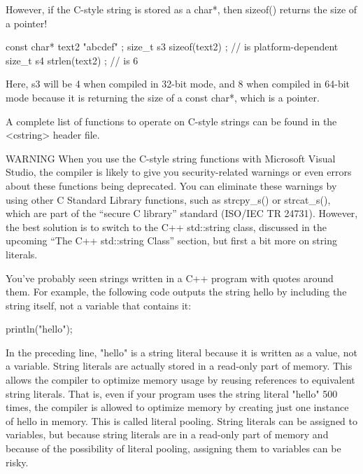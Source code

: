 However, if the C-style string is stored as a char*, then sizeof() returns the size of a pointer!

\begin{cpp}
const char* text2 { "abcdef" };
size_t s3 { sizeof(text2) }; // is platform-dependent
size_t s4 { strlen(text2) }; // is 6
\end{cpp}

Here, s3 will be 4 when compiled in 32-bit mode, and 8 when compiled in 64-bit mode because it is returning the size of a const char*, which is a pointer.

A complete list of functions to operate on C-style strings can be found in the <cstring> header file.

\begin{myWarning}{WARNING}
When you use the C-style string functions with Microsoft Visual Studio, the compiler is likely to give you security-related warnings or even errors about these functions being deprecated. You can eliminate these warnings by using other C Standard Library functions, such as strcpy\_s() or strcat\_s(), which are part of the “secure C library” standard (ISO/IEC TR 24731). However, the best solution is to switch to the C++ std::string class, discussed in the upcoming “The C++ std::string Class” section, but first a bit more on string literals.
\end{myWarning}


You’ve probably seen strings written in a C++ program with quotes around them. For example, the following code outputs the string hello by including the string itself, not a variable that contains it:

\begin{cpp}
println("hello");
\end{cpp}

In the preceding line, "hello" is a string literal because it is written as a value, not a variable. String literals are actually stored in a read-only part of memory. This allows the compiler to optimize memory usage by reusing references to equivalent string literals. That is, even if your program uses the string literal "hello" 500 times, the compiler is allowed to optimize memory by creating just one instance of hello in memory. This is called literal pooling.
String literals can be assigned to variables, but because string literals are in a read-only part of memory and because of the possibility of literal pooling, assigning them to variables can be risky.

